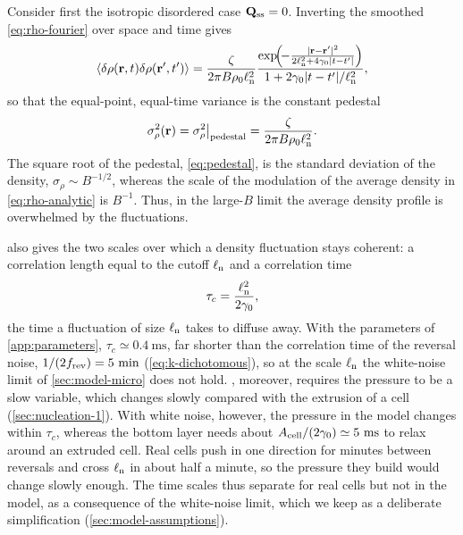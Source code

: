 \documentclass[aps,pre,reprint,superscriptaddress,longbibliography,nofootinbib
]{revtex4-2}
\begin{document}
Consider first the isotropic disordered case $\mathbf{Q}_{\mathrm{ss}}=0$.
Inverting the smoothed \cref{eq:rho-fourier} over space and
time gives
\begin{align}
  \label{eq:rho-autocorrelation-isotropic}
  \left\langle\delta\rho(\mathbf{r},t)\delta\rho(\mathbf{r}',t')\right\rangle =
  \frac{\zeta}{2\pi B\rho_0 \ell_{\rm n}^2}
  \frac{
      \exp\!\!\left(\!-\frac{|\mathbf{r}-\mathbf{r}'|^2}{2 \ell_{\rm n}^2+4 \gamma_0 |t-t'|}\right)
      }{1 + 2 \gamma_0 |t-t'| / \ell_{\rm n}^2},
\end{align}
so that the equal-point, equal-time variance is the
constant pedestal
\begin{align}
  \label{eq:pedestal}
  \sigma_\rho^2(\mathbf{r}) = \sigma_\rho^2\big|_\text{pedestal}
  = \frac{\zeta}{2\pi B\rho_0\ell_{\rm n}^2}.
\end{align}
The square root of the pedestal, \cref{eq:pedestal}, is the
standard deviation of the density, $\sigma_\rho \sim
B^{-1/2}$, whereas the scale of the modulation of the
average density in \cref{eq:rho-analytic} is $B^{-1}$.
Thus, in the large-$B$ limit the average density profile is
overwhelmed by the fluctuations.

 also gives the two
scales over which a density fluctuation stays coherent: a
correlation length equal to the cutoff $\ell_{\rm n}$ and a
correlation time
\begin{align}
 \label{eq:tau-c}
 \tau_c = \frac{\ell_{\rm n}^2}{2 \gamma_0},
\end{align}
the time a fluctuation of size $\ell_{\rm n}$ takes to diffuse
away. With the parameters of \cref{app:parameters},
$\tau_c\simeq0.4~\mathrm{ms}$, far shorter than the
correlation time of the reversal noise,
$1/(2f_{\rm rev})=5~\text{min}$ (\cref{eq:k-dichotomous}), so at the
scale $\ell_{\rm n}$ the white-noise limit of
\cref{sec:model-micro} does not hold.
, moreover, requires
the pressure to be a slow variable, which changes slowly
compared with the extrusion of a cell
(\cref{sec:nucleation-1}). With white noise, however, the
pressure in the model changes within $\tau_c$, whereas the
bottom layer needs about
${A_{\rm cell}}/(2\gamma_0)\simeq5~\mathrm{ms}$ to relax around an
extruded cell. Real cells push in one direction for minutes
between reversals and cross $\ell_{\rm n}$ in about half a minute,
so the pressure they build would change slowly enough. The
time scales thus separate for real cells but not in the
model, as a consequence of the white-noise limit, which we
keep as a deliberate simplification
(\cref{sec:model-assumptions}).
\end{document}
